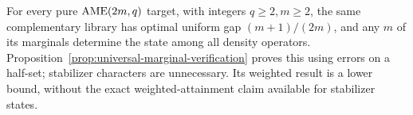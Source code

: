 \begin{remark}
\label{rem:universal-verification}
For every pure \(\mathrm{AME}(2m,q)\) target, with integers \(q\geq2,m\geq2\),
the same complementary library has optimal uniform gap
\((m+1)/(2m)\), and any \(m\) of its marginals determine the state among
all density operators.  Proposition~\ref{prop:universal-marginal-verification}
proves this using errors on a half-set; stabilizer characters are unnecessary.
Its weighted result is a lower bound, without the exact weighted-attainment
claim available for stabilizer states.
\end{remark}
